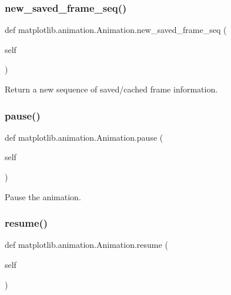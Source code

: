 \subsubsection{\texorpdfstring{new\+\_\+saved\+\_\+frame\+\_\+seq()}{new\_saved\_frame\_seq()}}
{\footnotesize\ttfamily def matplotlib.\+animation.\+Animation.\+new\+\_\+saved\+\_\+frame\+\_\+seq (\begin{DoxyParamCaption}\item[{}]{self }\end{DoxyParamCaption})}

\begin{DoxyVerb}Return a new sequence of saved/cached frame information.\end{DoxyVerb}
 \mbox{\label{classmatplotlib_1_1animation_1_1Animation_a2e007cee4cebf13e23fc7d97dcbd6619}} 
\subsubsection{\texorpdfstring{pause()}{pause()}}
{\footnotesize\ttfamily def matplotlib.\+animation.\+Animation.\+pause (\begin{DoxyParamCaption}\item[{}]{self }\end{DoxyParamCaption})}

\begin{DoxyVerb}Pause the animation.\end{DoxyVerb}
 \mbox{\label{classmatplotlib_1_1animation_1_1Animation_ab48ae2a1cb4116bca127975df3cefe43}} 
\subsubsection{\texorpdfstring{resume()}{resume()}}
{\footnotesize\ttfamily def matplotlib.\+animation.\+Animation.\+resume (\begin{DoxyParamCaption}\item[{}]{self }\end{DoxyParamCaption})}

